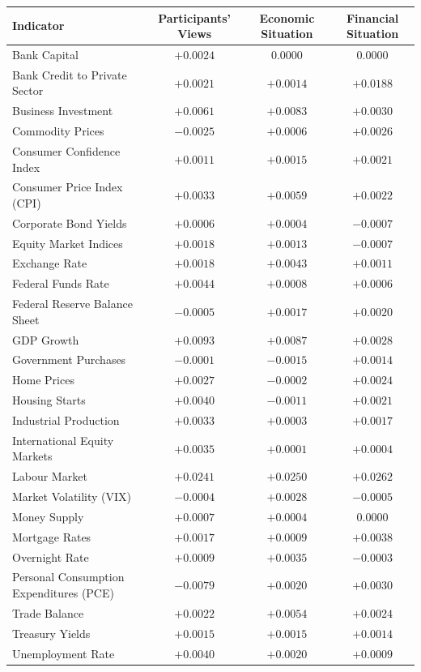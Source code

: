 \begin{tabular}{p{4.7cm}ccc}
\toprule
\textbf{Indicator} & \textbf{Participants' Views} & \textbf{Economic Situation} & \textbf{Financial Situation} \\
\midrule
Bank Capital & $+0.0024$ & $0.0000$ & $0.0000$ \\
Bank Credit to Private Sector & $+0.0021$ & $+0.0014$ & $+0.0188$ \\
Business Investment & $+0.0061$ & $+0.0083$ & $+0.0030$ \\
Commodity Prices & $-0.0025$ & $+0.0006$ & $+0.0026$ \\
Consumer Confidence Index & $+0.0011$ & $+0.0015$ & $+0.0021$ \\
Consumer Price Index (CPI) & $+0.0033$ & $+0.0059$ & $+0.0022$ \\
Corporate Bond Yields & $+0.0006$ & $+0.0004$ & $-0.0007$ \\
Equity Market Indices & $+0.0018$ & $+0.0013$ & $-0.0007$ \\
Exchange Rate & $+0.0018$ & $+0.0043$ & $+0.0011$ \\
Federal Funds Rate & $+0.0044$ & $+0.0008$ & $+0.0006$ \\
Federal Reserve Balance Sheet & $-0.0005$ & $+0.0017$ & $+0.0020$ \\
GDP Growth & $+0.0093$ & $+0.0087$ & $+0.0028$ \\
Government Purchases & $-0.0001$ & $-0.0015$ & $+0.0014$ \\
Home Prices & $+0.0027$ & $-0.0002$ & $+0.0024$ \\
Housing Starts & $+0.0040$ & $-0.0011$ & $+0.0021$ \\
Industrial Production & $+0.0033$ & $+0.0003$ & $+0.0017$ \\
International Equity Markets & $+0.0035$ & $+0.0001$ & $+0.0004$ \\
Labour Market & $+0.0241$ & $+0.0250$ & $+0.0262$ \\
Market Volatility (VIX) & $-0.0004$ & $+0.0028$ & $-0.0005$ \\
Money Supply & $+0.0007$ & $+0.0004$ & $0.0000$ \\
Mortgage Rates & $+0.0017$ & $+0.0009$ & $+0.0038$ \\
Overnight Rate & $+0.0009$ & $+0.0035$ & $-0.0003$ \\
Personal Consumption Expenditures (PCE) & $-0.0079$ & $+0.0020$ & $+0.0030$ \\
Trade Balance & $+0.0022$ & $+0.0054$ & $+0.0024$ \\
Treasury Yields & $+0.0015$ & $+0.0015$ & $+0.0014$ \\
Unemployment Rate & $+0.0040$ & $+0.0020$ & $+0.0009$ \\
\bottomrule
\end{tabular}
